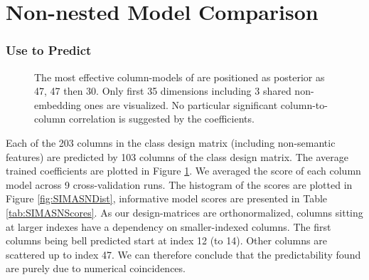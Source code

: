 \section{Non-nested Model Comparison}
\label{appsubsec:nonnestedcompres}

\subsubsection{Use  to Predict }

\begin{figure}
    \centering
            \caption[Coefficients of \texttt{SIM} Columns Predicting \texttt{ASN}]{The most effective column-models of  are positioned as posterior as 47, 47 then 30. Only first 35 dimensions including 3 shared non-embedding ones are visualized. No particular significant column-to-column correlation is suggested by the coefficients.} 
            \label{fig:SIMASNMODELCOMP}
\end{figure}

Each of the 203 columns in the  class design matrix (including non-semantic features) are predicted by 103 columns of the  class design matrix. The average trained coefficients are plotted in Figure \ref{fig:SIMASNMODELCOMP}. We averaged the  score of each column model across 9 cross-validation runs. The histogram of the scores are plotted in Figure \ref{fig:SIMASNDist}, informative model scores are presented in Table \ref{tab:SIMASNScores}. As our design-matrices are orthonormalized, columns sitting at larger indexes have a dependency on smaller-indexed columns. The first columns being bell predicted start at index 12 (to 14). Other columns are scattered up to index 47. We can therefore conclude that the predictability found are purely due to numerical coincidences.

